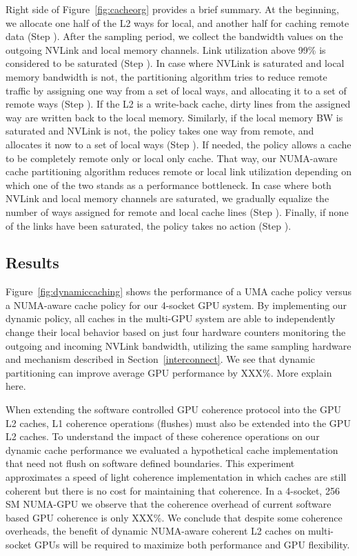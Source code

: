 Right side of Figure~\ref{fig:cacheorg} provides a brief summary. At the beginning, 
we allocate one half of the L2 ways for local, and another half for caching 
remote data (Step ). After the sampling period, we collect the 
bandwidth values on the outgoing NVLink and local memory channels. Link 
utilization above 99\% is considered to be saturated (Step ). 
In case where NVLink is saturated and local memory bandwidth is not, the 
partitioning algorithm tries to reduce remote traffic by assigning one way 
from a set of local ways, and allocating it to a set of remote ways 
(Step ). If the L2 is a write-back cache, dirty lines from the 
assigned way are written back to the local memory. Similarly, if the local 
memory BW is saturated and NVLink is not, the policy takes one way from 
remote, and allocates it now to a set of local ways (Step ). 
If needed, the policy allows a cache to be completely remote only or local 
only cache. That way, our NUMA-aware cache partitioning algorithm reduces 
remote or local link utilization depending on which one of the two stands as 
a performance bottleneck. In case where both NVLink and local memory channels 
are saturated, we gradually equalize the number of ways assigned for remote 
and local cache lines (Step ). Finally, if none of the links have 
been saturated, the policy takes no action (Step ). 

\subsection{Results}

Figure~\ref{fig:dynamiccaching} shows the performance of a UMA cache policy versus
a NUMA-aware cache policy for our 4-socket GPU system.  By implementing our dynamic
policy, all caches in the multi-GPU system are able to independently change their local
behavior based on just four hardware counters monitoring the outgoing and incoming
NVLink bandwidth, utilizing the same sampling hardware and mechanism described in 
Section~\ref{interconnect}.  We see that dynamic partitioning can improve average GPU
performance by XXX\%.  More explain here.



 When extending the software controlled GPU coherence protocol into the GPU L2 caches,
L1 coherence operations (flushes) must also be extended into the GPU L2 caches.  To understand
the impact of these coherence operations on our dynamic cache performance we evaluated a hypothetical
cache implementation that need not flush on software defined boundaries.  This experiment
approximates a speed of light coherence implementation in which caches are still coherent but
there is no cost for maintaining that coherence.  In a 4-socket, 256 SM NUMA-GPU we observe
that the coherence overhead of current software based GPU coherence is only XXX\%.  We conclude
that despite some coherence overheads, the benefit of dynamic NUMA-aware coherent L2 caches
on multi-socket GPUs will be required to maximize both performance and GPU flexibility.


